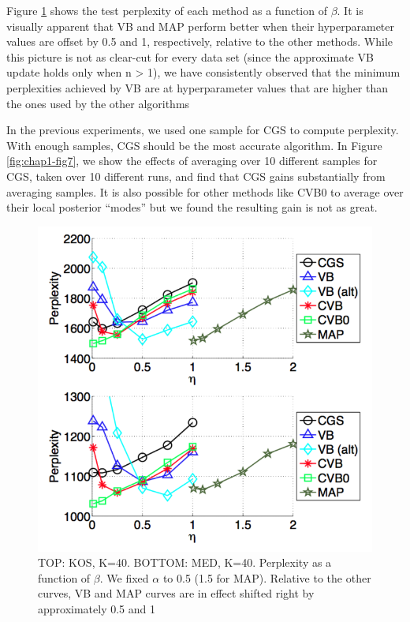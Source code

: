 Figure \ref{fig:chap1-fig6} shows the test perplexity of each method as a function of $\beta$. It is visually apparent that VB and MAP perform better when their hyperparameter values are offset by 0.5 and 1, respectively, relative to the other methods. While this picture is not as clear-cut for every data set (since the approximate VB update holds only when n > 1), we have consistently observed that the minimum perplexities achieved by VB are at hyperparameter values that are higher than the ones used by the other algorithms

In the previous experiments, we used one sample for CGS to compute perplexity. With enough samples, CGS should be the most accurate algorithm. In Figure \ref{fig:chap1-fig7}, we show the effects of averaging over 10 different samples for CGS, taken over 10 different runs, and find that CGS gains substantially from averaging samples. It is also possible for other methods like CVB0 to average over their local posterior “modes” but we found the resulting gain is not as great.


\begin{figure}
  \centering
    \hspace*{-1.5cm}\includegraphics[height=0.36\textheight]{./Chap1/plots/figs/fig6.png}
  \caption{TOP: KOS, K=40. BOTTOM: MED, K=40. Perplexity as a function of $\beta$. We fixed $\alpha$ to 0.5 (1.5 for MAP). Relative to the other curves, VB and MAP curves are in effect shifted right by approximately 0.5 and 1}
  \label{fig:chap1-fig6}
\end{figure}


